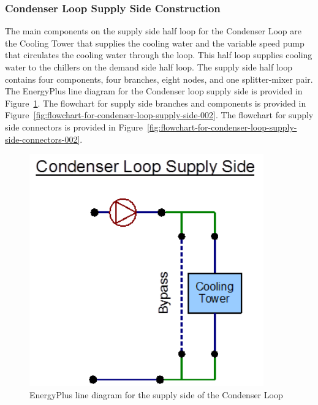 \subsubsection{Condenser Loop Supply Side Construction}\label{condenser-loop-supply-side-construction-000}

The main components on the supply side half loop for the Condenser Loop are the Cooling Tower that supplies the cooling water and the variable speed pump that circulates the cooling water through the loop. This half loop supplies cooling water to the chillers on the demand side half loop. The supply side half loop contains four components, four branches, eight nodes, and one splitter-mixer pair. The EnergyPlus line diagram for the Condenser loop supply side is provided in Figure~\ref{fig:energyplus-line-diagram-for-the-supply-side-002}. The flowchart for supply side branches and components is provided in Figure~\ref{fig:flowchart-for-condenser-loop-supply-side-002}. The flowchart for supply side connectors is provided in Figure~\ref{fig:flowchart-for-condenser-loop-supply-side-connectors-002}.

\begin{figure}[hbtp] %
\centering
\includegraphics[width=0.9\textwidth, height=0.9\textheight, keepaspectratio=true]{media/image119.png}
\caption{EnergyPlus line diagram for the supply side of the Condenser Loop \protect \label{fig:energyplus-line-diagram-for-the-supply-side-002}}
\end{figure}

